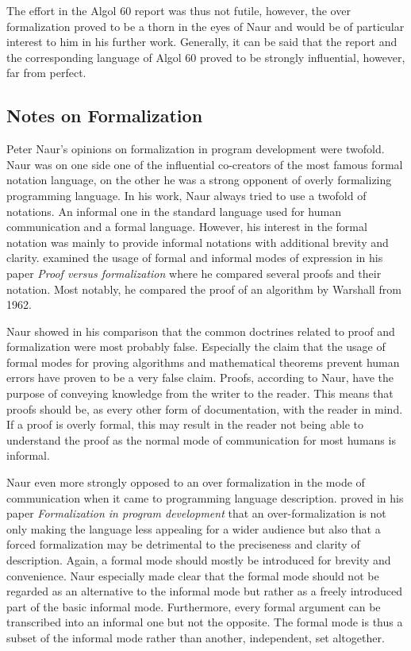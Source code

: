 \documentclass{article}
\begin{document}
The effort in the Algol 60 report was thus not futile, however, the over formalization proved to be a thorn in the eyes of Naur and would be of particular interest to him in his further work. Generally, it can be said that the report and the corresponding language of Algol 60 proved to be strongly influential, however, far from perfect.

\subsection{Notes on Formalization}
Peter Naur's opinions on formalization in program development were twofold. Naur was on one side one of the influential co-creators of the most famous formal notation language, on the other he was a strong opponent of overly formalizing programming language. In his work, Naur always tried to use a twofold of notations. An informal one in the standard language used for human communication and a formal language. However, his interest in the formal notation was mainly to provide informal notations with additional brevity and clarity. \cite{naur1994proof} examined the usage of formal and informal modes of expression in his paper \textit{Proof versus formalization} where he compared several proofs and their notation. Most notably, he compared the proof of an algorithm by Warshall from 1962. 

Naur showed in his comparison that the common doctrines related to proof and formalization were most probably false. Especially the claim that the usage of formal modes for proving algorithms and mathematical theorems prevent human errors have proven to be a very false claim. Proofs, according to Naur, have the purpose of conveying knowledge from the writer to the reader. This means that proofs should be, as every other form of documentation, with the reader in mind. If a proof is overly formal, this may result in the reader not being able to understand the proof as the normal mode of communication for most humans is informal.

Naur even more strongly opposed to an over formalization in the mode of communication when it came to programming language description. \cite{naur1982formalization} proved in his paper \textit{Formalization in program development} that an over-formalization is not only making the language less appealing for a wider audience but also that a forced formalization may be detrimental to the preciseness and clarity of description. Again, a formal mode should mostly be introduced for brevity and convenience. Naur especially made clear that the formal mode should not be regarded as an alternative to the informal mode but rather as a freely introduced part of the basic informal mode. Furthermore, every formal argument can be transcribed into an informal one but not the opposite. The formal mode is thus a subset of the informal mode rather than another, independent, set altogether. 
\end{document}
